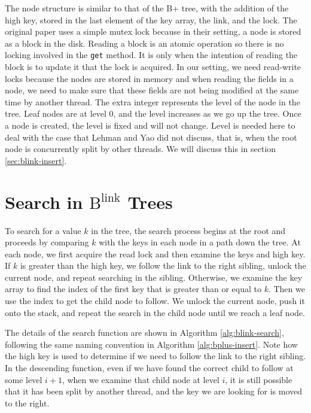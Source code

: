 \documentclass[11pt]{report}
\theoremstyle{definition}
\begin{document}
The node structure is similar to that of the B+ tree, with the addition of the high key, stored in the last element of the key array, the link, and the lock. The original paper uses a simple mutex lock because in their setting, a node is stored as a block in the disk. Reading a block is an atomic operation so there is no locking involved in the \texttt{get} method. It is only when the intention of reading the block is to update it that the lock is acquired. In our setting, we need read-write locks because the nodes are stored in memory and when reading the fields in a node, we need to make sure that these fields are not being modified at the same time by another thread. The extra integer represents the level of the node in the tree. Leaf nodes are at level 0, and the level increases as we go up the tree. Once a node is created, the level is fixed and will not change. Level is needed here to deal with the case that Lehman and Yao did not discuss, that is, when the root node is concurrently split by other threads. We will discuss this in section \ref{sec:blink-insert}.

\section{Search in $\text{B}^{\text{link}}$ Trees}
\label{sec:blink-search}

To search for a value $k$ in the tree, the search process begins at the root and proceeds by comparing $k$ with the keys in each node in a path down the tree. At each node, we first acquire the read lock and then examine the keys and high key. If $k$ is greater than the high key, we follow the link to the right sibling, unlock the current node, and repeat searching in the sibling. Otherwise, we examine the key array to find the index of the first key that is greater than or equal to $k$. Then we use the index to get the child node to follow. We unlock the current node, push it onto the stack, and repeat the search in the child node until we reach a leaf node.

The details of the search function are shown in Algorithm \ref{alg:blink-search}, following the same naming convention in Algorithm \ref{alg:bplus-insert}. Note how the high key is used to determine if we need to follow the link to the right sibling. In the descending function, even if we have found the correct child to follow at some level $i + 1$, when we examine that child node at level $i$, it is still possible that it has been split by another thread, and the key we are looking for is moved to the right.
\end{document}

